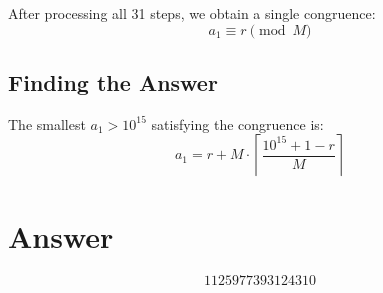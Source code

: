 \documentclass[12pt]{article}
\begin{document}
After processing all 31 steps, we obtain a single congruence:
\[
a_1 \equiv r \pmod{M}
\]

\subsection{Finding the Answer}

The smallest $a_1 > 10^{15}$ satisfying the congruence is:
\[
a_1 = r + M \cdot \left\lceil \frac{10^{15} + 1 - r}{M} \right\rceil
\]

\section{Answer}

\[
\boxed{1125977393124310}
\]
\end{document}
